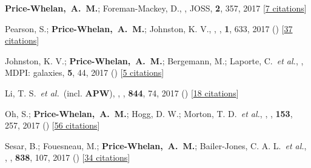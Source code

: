 \item[{\color{deemph}\scriptsize30}]\textbf{Price-Whelan,~A.~M.}; Foreman-Mackey, D., , JOSS, \textbf{2}, 357, 2017 [\href{http://adsabs.harvard.edu/abs/2017JOSS....2..357P}{7 citations}]

\item[{\color{deemph}\scriptsize29}]Pearson, S.; \textbf{Price-Whelan,~A.~M.}; Johnston, K. V., , \natureast, \textbf{1}, 633, 2017 () [\href{http://adsabs.harvard.edu/abs/2017NatAs...1..633P}{37 citations}]

\item[{\color{deemph}\scriptsize28}]Johnston, K. V.; \textbf{Price-Whelan,~A.~M.}; Bergemann, M.; Laporte, C.~\textit{et al.}, , MDPI: galaxies, \textbf{5}, 44, 2017 () [\href{http://adsabs.harvard.edu/abs/2017Galax...5...44J}{5 citations}]

\item[{\color{deemph}\scriptsize27}]Li, T. S.~\textit{et al.}~(incl. \textbf{APW}), , \apj, \textbf{844}, 74, 2017 () [\href{http://adsabs.harvard.edu/abs/2017ApJ...844...74L}{18 citations}]

\item[{\color{deemph}\scriptsize26}]Oh, S.; \textbf{Price-Whelan,~A.~M.}; Hogg, D. W.; Morton, T. D.~\textit{et al.}, , \aj, \textbf{153}, 257, 2017 () [\href{http://adsabs.harvard.edu/abs/2017AJ....153..257O}{56 citations}]

\item[{\color{deemph}\scriptsize25}]Sesar, B.; Fouesneau, M.; \textbf{Price-Whelan,~A.~M.}; Bailer-Jones, C. A. L.~\textit{et al.}, , \apj, \textbf{838}, 107, 2017 () [\href{http://adsabs.harvard.edu/abs/2017ApJ...838..107S}{34 citations}]

